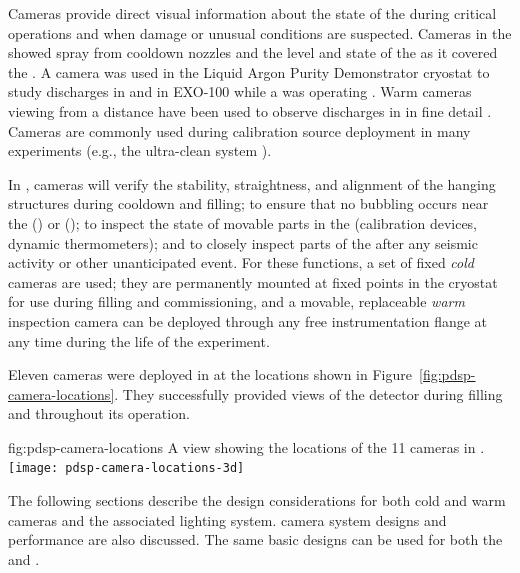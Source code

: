 Cameras provide direct visual information about the state of the
 during critical operations and when damage or unusual
conditions are suspected.  Cameras in the  showed spray from cooldown
nozzles and the level and state of the  as it covered the  \cite{Murphy:20170516}.  A camera was
used in the Liquid Argon Purity Demonstrator
cryostat\cite{Adamowski:2014daa} to study  discharges in
 and in EXO-100 while a  was operating
\cite{Delaquis:2013hva}.  Warm cameras viewing  from a distance
have been used to observe  discharges in  in
fine detail \cite{Auger:2015xlo}.  Cameras are commonly used during
calibration source deployment in many experiments (e.g., the
\kamland ultra-clean system \cite{Banks:2014hra}).

In , cameras will verify the stability, straightness,
and alignment of the hanging  structures during cooldown and
filling; to ensure that no bubbling occurs near the 
(\single) or  (\dual); to inspect the
state of movable parts in the  (calibration devices, dynamic
thermometers); and to closely inspect parts of the  after any seismic activity or other unanticipated
event.  For these functions, a set of fixed
\textit{cold} cameras are used; they are permanently mounted at fixed points in the cryostat
for use during filling and commissioning, and a movable, replaceable
\textit{warm} inspection camera can be deployed through any free
instrumentation flange at any time during the life of the
experiment. 

Eleven cameras were deployed in  at the locations shown in Figure~\ref{fig:pdsp-camera-locations}. They successfully provided views of the detector during filling and throughout %
its operation. %

\begin{dunefigure}{fig:pdsp-camera-locations}
  {A \threed view showing the locations of the 11 cameras in .}
  \texttt{[image: pdsp-camera-locations-3d]}%
\end{dunefigure}

The following sections describe the design considerations for both cold
and warm cameras and the associated lighting system.  camera system designs and performance are also discussed.  
The same basic
designs can be used for both the \single and \dual {}.



